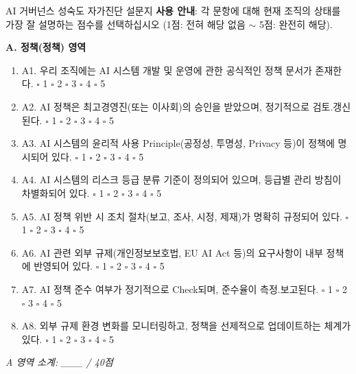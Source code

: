 \begin{practicaltool}{AI 거버넌스 성숙도 자가진단 설문지}
\textbf{사용 안내}: 각 문항에 대해 현재 조직의 상태를 가장 잘 설명하는 점수를 선택하십시오 (1점: 전혀 해당 없음 $\sim$ 5점: 완전히 해당).

\textbf{A. 정책(정책) 영역}
\begin{enumerate}
 \item A1. 우리 조직에는 AI 시스템 개발 및 운영에 관한 공식적인 정책 문서가 존재한다. \hfill $\square$ 1 $\square$ 2 $\square$ 3 $\square$ 4 $\square$ 5
 \item A2. AI 정책은 최고경영진(또는 이사회)의 승인을 받았으며, 정기적으로 검토.갱신된다. \hfill $\square$ 1 $\square$ 2 $\square$ 3 $\square$ 4 $\square$ 5
 \item A3. AI 시스템의 윤리적 사용 Principle(공정성, 투명성, Privacy 등)이 정책에 명시되어 있다. \hfill $\square$ 1 $\square$ 2 $\square$ 3 $\square$ 4 $\square$ 5
 \item A4. AI 시스템의 리스크 등급 분류 기준이 정의되어 있으며, 등급별 관리 방침이 차별화되어 있다. \hfill $\square$ 1 $\square$ 2 $\square$ 3 $\square$ 4 $\square$ 5
 \item A5. AI 정책 위반 시 조치 절차(보고, 조사, 시정, 제재)가 명확히 규정되어 있다. \hfill $\square$ 1 $\square$ 2 $\square$ 3 $\square$ 4 $\square$ 5
 \item A6. AI 관련 외부 규제(개인정보보호법, EU AI Act 등)의 요구사항이 내부 정책에 반영되어 있다. \hfill $\square$ 1 $\square$ 2 $\square$ 3 $\square$ 4 $\square$ 5
 \item A7. AI 정책 준수 여부가 정기적으로 Check되며, 준수율이 측정.보고된다. \hfill $\square$ 1 $\square$ 2 $\square$ 3 $\square$ 4 $\square$ 5
 \item A8. 외부 규제 환경 변화를 모니터링하고, 정책을 선제적으로 업데이트하는 체계가 있다. \hfill $\square$ 1 $\square$ 2 $\square$ 3 $\square$ 4 $\square$ 5
\end{enumerate}
\textit{A 영역 소계: \_\_\_ / 40점}


\end{practicaltool}

